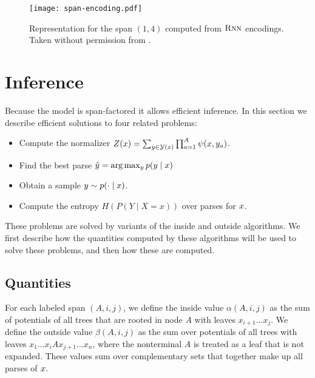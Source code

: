 \begin{figure}
  \texttt{[image: span-encoding.pdf]}
  \caption{Representation for the span $(1, 4)$ computed from $\textsc{Rnn}$ encodings. Taken without permission from \citet{stern2018analyis}.}
  \label{fig:span-feature}
\end{figure}

\section{Inference}
Because the model is span-factored it allows efficient inference. In this section we describe efficient solutions to four related problems:
\begin{itemize}
  \item Compute the normalizer $Z(x) = \sum_{ y \in \mathcal{Y}(x) } \prod_{ a=1 }^{ A } \psi( x, y_a )$.
  \item Find the best parse $\hat{ y } = \arg \max_{y } p(y  \mid x)$
  \item Obtain a sample $y \sim p(\cdot \mid x)$.
  \item Compute the entropy $H(P(Y \mid X = x))$ over parses for $x$.
\end{itemize}
These problems are solved by variants of the inside and outside algorithms. We first describe how the quantities computed by these algorithms will be used to solve these problems, and then how these are computed.

\subsection{Quantities}
  For each labeled span $(A, i, j)$, we define the inside value $\alpha(A, i, j)$ as the sum of potentials of all trees that are rooted in node $A$ with leaves $x_{i+1} \dots x_j$. We define the outside value $\beta(A, i, j)$ as the sum over potentials of all trees with leaves $x_1 \dots x_i A x_{j+1} \dots x_n$, where the nonterminal $A$ is treated as a leaf that is not expanded. These values sum over complementary sets that together make up all parses of $x$.


